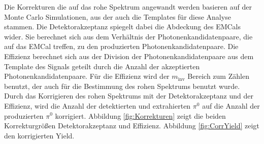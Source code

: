 Die Korrekturen die auf das rohe Spektrum angewandt werden basieren auf der Monte Carlo Simulationen, aus der auch die Templates für diese Analyse stammen.
\newline
Die Detektorakzeptanz spiegelt dabei die Abdeckung des EMCals wider.
Sie berechnet sich aus dem Verhältnis der Photonenkandidatenpaare, die auf das EMCal treffen, zu den produzierten Photonenkandidatenpaare.
\newline
Die Effizienz berechnet sich aus der Division der Photonenkandidatenpaare aus dem Template des Signals geteilt durch die Anzahl der akzeptierten Photonenkandidatenpaare.
Für die Effizienz wird der $m_\text{inv}$ Bereich zum Zählen benutzt, der auch für die Bestimmung des rohen Spektrums benutzt wurde.
\newline
Durch das Korrigieren des rohen Spektrums mit der Detektorakzeptanz und der Effizienz, wird die Anzahl der detektierten und extrahierten $\pi^{0}$ auf die Anzahl der produzierten $\pi^{0}$ korrigiert.
Abbildung \ref{fig:Korrekturen} zeigt die beiden Korrekturgrößen Detektorakzeptanz und Effizienz.
Abbildung \ref{fig:CorrYield} zeigt den korrigierten Yield.
